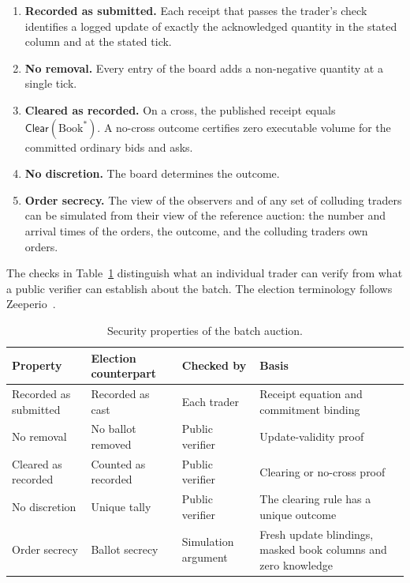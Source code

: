 \begin{enumerate}
\def\labelenumi{\arabic{enumi}.}
\item
  \textbf{Recorded as submitted.} Each receipt that passes the trader's check identifies a logged update of exactly the acknowledged quantity in the stated column and at the stated tick.
\item
  \textbf{No removal.} Every entry of the board adds a non-negative quantity at a single tick.
\item
  \textbf{Cleared as recorded.} On a cross, the published receipt equals \(\mathsf{Clear}(\text{Book}^*)\). A no-cross outcome certifies zero executable volume for the committed ordinary bids and asks.
\item
  \textbf{No discretion.} The board determines the outcome.
\item
  \textbf{Order secrecy.} The view of the observers and of any set of colluding traders can be simulated from their view of the reference auction: the number and arrival times of the orders, the outcome, and the colluding traders\textquotesingle{} own orders.
\end{enumerate}

The checks in Table~\ref{tab:zq-security-properties} distinguish what an individual trader can verify from what a public verifier can establish about the batch. The election terminology follows Zeeperio~\cite{MEC26}.

\begingroup
\small
\setlength{\tabcolsep}{3pt}
\begin{longtable}{@{}p{.20\linewidth}p{.20\linewidth}p{.18\linewidth}p{.33\linewidth}@{}}
\caption{Security properties of the batch auction.}\label{tab:zq-security-properties}\\
\toprule
Property & Election counterpart & Checked by & Basis \\
\midrule
\endhead
Recorded as submitted & Recorded as cast & Each trader & Receipt equation and commitment binding \\
No removal & No ballot removed & Public verifier & Update-validity proof \\
Cleared as recorded & Counted as recorded & Public verifier & Clearing or no-cross proof \\
No discretion & Unique tally & Public verifier & The clearing rule has a unique outcome \\
Order secrecy & Ballot secrecy & Simulation argument & Fresh update blindings, masked book columns and zero knowledge \\
\bottomrule
\end{longtable}
\endgroup

